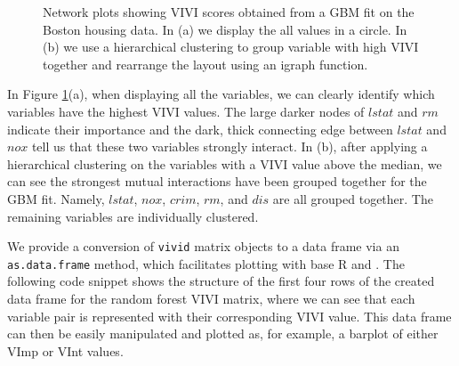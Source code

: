 \begin{figure}

{\centering {}

}

\caption{Network plots showing VIVI scores obtained from a GBM fit on the Boston housing data. In (a) we display the all values in a circle. In (b) we use a hierarchical clustering to group variable with high VIVI together and rearrange the layout using an igraph function.}\label{fig:networks1}
\end{figure}

In Figure \ref{fig:networks1}(a), when displaying all the variables, we can clearly identify which variables have the highest VIVI values. The large darker nodes of \(lstat\) and \(rm\) indicate their importance and the dark, thick connecting edge between \(lstat\) and \(nox\) tell us that these two variables strongly interact. In (b), after applying a hierarchical clustering on the variables with a VIVI value above the median, we can see the strongest mutual interactions have been grouped together for the GBM fit. Namely, \(lstat\), \(nox\), \(crim\), \(rm\), and \(dis\) are all grouped together. The remaining variables are individually clustered.

We provide a conversion of \texttt{vivid} matrix objects to a data frame via an \texttt{as.data.frame} method, which facilitates plotting with base R and . The following code snippet shows the structure of the first four rows of the created data frame for the random forest VIVI matrix, where we can see that each variable pair is represented with their corresponding VIVI value. This data frame can then be easily manipulated and plotted as, for example, a barplot of either VImp or VInt values.

